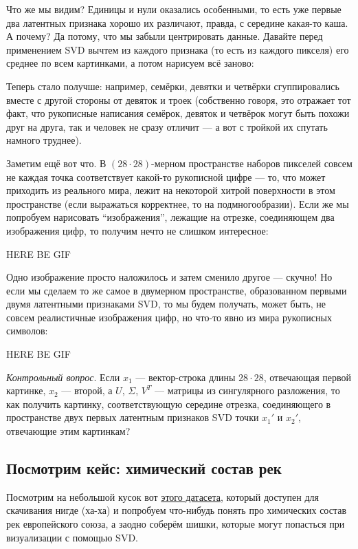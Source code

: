\documentclass{amsart}
\theoremstyle{definition}
\theoremstyle{remark}
\numberwithin{equation}{section}
\begin{document}
Что же мы видим? Единицы и нули оказались особенными, то есть уже первые два латентных признака хорошо их различают, правда, с середине какая-то каша. А почему? Да потому, что мы забыли центрировать данные. Давайте перед применением SVD вычтем из каждого признака (то есть из каждого пикселя) его среднее по всем картинками, а потом нарисуем всё заново:

\begin{center}
\end{center}

Теперь стало получше: например, семёрки, девятки и четвёрки сгуппировались вместе с другой стороны от девяток и троек (собственно говоря, это отражает тот факт, что рукописные написания семёрок, девяток и четвёрок могут быть похожи друг на друга, так и человек не сразу отличит --- а вот с тройкой их спутать намного труднее).

Заметим ещё вот что. В $(28\cdot28)$-мерном пространстве наборов пикселей совсем не каждая точка соответствует какой-то рукописной цифре --- то, что может приходить из реального мира, лежит на некоторой хитрой поверхности в этом пространстве (если выражаться корректнее, то на подмногообразии). Если же мы попробуем нарисовать ``изображения'', лежащие на отрезке, соединяющем два изображения цифр, то получим нечто не слишком интересное:

HERE BE GIF


Одно изображение просто наложилось и затем сменило другое --- скучно! Но если мы сделаем то же самое в двумерном пространстве, образованном первыми двумя латентными признаками SVD, то мы будем получать, может быть, не совсем реалистичные изображения цифр, но что-то явно из мира рукописных символов:

HERE BE GIF

\textit{Контрольный вопрос}. Если $x_1$ --- вектор-строка длины $28\cdot28$, отвечающая первой картинке, $x_2$ --- второй, а $U$, $\Sigma$, $V^T$ --- матрицы из сингулярного разложения, то как получить картинку, соответствующую середине отрезка, соединяющего в пространстве двух первых латентным признаков SVD точки $x_1'$ и $x_2'$, отвечающие этим картинкам?

\subsection{Посмотрим кейс: химический состав рек} Посмотрим на небольшой кусок вот \href{https://data.europa.eu/euodp/en/data/dataset/data_waterbase-rivers-10}{этого датасета}, который доступен для скачивания нигде (ха-ха) и попробуем что-нибудь понять про химических состав рек европейского союза, а заодно соберём шишки, которые могут попасться при визуализации с помощью SVD.
\end{document}
